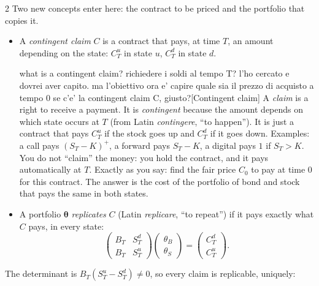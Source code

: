 \begin{paracol}{2}
Two new concepts enter here: the contract to be priced and the portfolio that copies it.
\begin{definition}\label{def:claim}
\leavevmode
\begin{itemize}
  \item A \emph{contingent claim} $C$ is a contract that pays, at time $T$, an amount depending on the
        state: $C_T^u$ in state $u$, $C_T^d$ in state $d$.\begin{answer}{what is a contingent claim? richiedere i soldi al tempo T? l'ho cercato e dovrei aver capito. ma l'obiettivo ora e' capire quale sia il prezzo di acquisto a tempo 0 se c'e' la contingent claim C, giusto?}[Contingent claim]\label{ans:claim}
A \emph{claim} is a right to receive a payment. It is \emph{contingent} because the amount depends on
which state occurs at $T$ (from Latin \emph{contingere}, ``to happen''). It is just a contract that
pays $C_T^u$ if the stock goes up and $C_T^d$ if it goes down. Examples: a call pays
$(S_T-K)^+$, a forward pays $S_T-K$, a digital pays $1$ if $S_T>K$.
You do not ``claim'' the money:
you hold the contract, and it pays automatically at $T$.
Exactly as you say: find the
fair price $C_0$ to pay at time $0$ for this contract. The answer is the cost of the portfolio of bond
and stock that pays the same in both states.
\end{answer}
  \item A portfolio $\bm\theta$ \emph{replicates} $C$ (Latin \emph{replicare}, ``to repeat'') if it pays exactly what $C$
        pays, in every state:
        \begin{equation}\label{eq:replic2}
          \begin{pmatrix} B_T & S_T^d\\ B_T & S_T^u\end{pmatrix}
          \begin{pmatrix}\theta_B\\ \theta_S\end{pmatrix}
          = \begin{pmatrix}C_T^d\\ C_T^u\end{pmatrix}.
        \end{equation}
\end{itemize}
\end{definition}
The determinant is $B_T(S_T^u-S_T^d)\neq0$, so every claim is replicable, uniquely:

\end{paracol}
